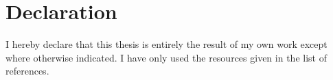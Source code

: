 

\chapter*{Declaration}


I hereby declare that this thesis is entirely the result of my own work except where otherwise indicated. I have only used the resources given in the list of references.